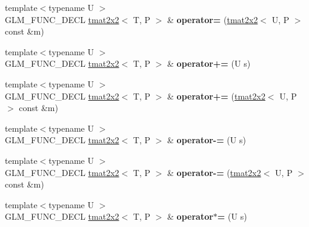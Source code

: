 \begin{DoxyCompactItemize}
\item 
\hypertarget{structglm_1_1tmat2x2_a825289bb785c04c724709112352b9dc6}{{\footnotesize template$<$typename U $>$ }\\G\-L\-M\-\_\-\-F\-U\-N\-C\-\_\-\-D\-E\-C\-L \hyperlink{structglm_1_1tmat2x2}{tmat2x2}$<$ T, P $>$ \& {\bfseries operator=} (\hyperlink{structglm_1_1tmat2x2}{tmat2x2}$<$ U, P $>$ const \&m)}\label{structglm_1_1tmat2x2_a825289bb785c04c724709112352b9dc6}

\item 
\hypertarget{structglm_1_1tmat2x2_abbd5502504beec0048c05e969aaaeb11}{{\footnotesize template$<$typename U $>$ }\\G\-L\-M\-\_\-\-F\-U\-N\-C\-\_\-\-D\-E\-C\-L \hyperlink{structglm_1_1tmat2x2}{tmat2x2}$<$ T, P $>$ \& {\bfseries operator+=} (U s)}\label{structglm_1_1tmat2x2_abbd5502504beec0048c05e969aaaeb11}

\item 
\hypertarget{structglm_1_1tmat2x2_a2d82c9fdd02307411612b97393275f38}{{\footnotesize template$<$typename U $>$ }\\G\-L\-M\-\_\-\-F\-U\-N\-C\-\_\-\-D\-E\-C\-L \hyperlink{structglm_1_1tmat2x2}{tmat2x2}$<$ T, P $>$ \& {\bfseries operator+=} (\hyperlink{structglm_1_1tmat2x2}{tmat2x2}$<$ U, P $>$ const \&m)}\label{structglm_1_1tmat2x2_a2d82c9fdd02307411612b97393275f38}

\item 
\hypertarget{structglm_1_1tmat2x2_aac5fa22c39a4a420d9639ca5702771e4}{{\footnotesize template$<$typename U $>$ }\\G\-L\-M\-\_\-\-F\-U\-N\-C\-\_\-\-D\-E\-C\-L \hyperlink{structglm_1_1tmat2x2}{tmat2x2}$<$ T, P $>$ \& {\bfseries operator-\/=} (U s)}\label{structglm_1_1tmat2x2_aac5fa22c39a4a420d9639ca5702771e4}

\item 
\hypertarget{structglm_1_1tmat2x2_ae7ef21b7c166f1d890d1e3e04b9da637}{{\footnotesize template$<$typename U $>$ }\\G\-L\-M\-\_\-\-F\-U\-N\-C\-\_\-\-D\-E\-C\-L \hyperlink{structglm_1_1tmat2x2}{tmat2x2}$<$ T, P $>$ \& {\bfseries operator-\/=} (\hyperlink{structglm_1_1tmat2x2}{tmat2x2}$<$ U, P $>$ const \&m)}\label{structglm_1_1tmat2x2_ae7ef21b7c166f1d890d1e3e04b9da637}

\item 
\hypertarget{structglm_1_1tmat2x2_a540b0eefa10666ec1b538ae89dfeddda}{{\footnotesize template$<$typename U $>$ }\\G\-L\-M\-\_\-\-F\-U\-N\-C\-\_\-\-D\-E\-C\-L \hyperlink{structglm_1_1tmat2x2}{tmat2x2}$<$ T, P $>$ \& {\bfseries operator$\ast$=} (U s)}\label{structglm_1_1tmat2x2_a540b0eefa10666ec1b538ae89dfeddda}


\end{DoxyCompactItemize}
